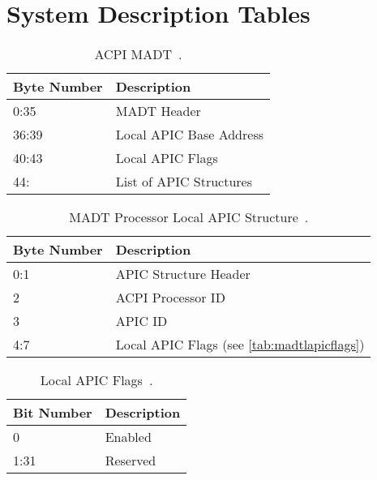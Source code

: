 \clearpage

\section{System Description Tables}
\label{sec:sdts}

\begin{table}[H]
  \centering
  \begin{tabularx}{1.0\textwidth}{| X | X |}
    \hline
    \textbf{Byte Number} & \textbf{Description}    \\ \hline\hline
    0:35                 & MADT Header             \\ \hline
    36:39                & Local APIC Base Address \\ \hline
    40:43                & Local APIC Flags        \\ \hline
    44:                  & List of APIC Structures \\ \hline
  \end{tabularx}
  \caption{ACPI MADT~\cite[sec.~5.2.8]{acpi1}.}
  \label{tab:madt}
\end{table}

\begin{table}[H]
  \centering
  \begin{tabularx}{1.0\textwidth}{| X | X |}
    \hline
    \textbf{Byte Number} & \textbf{Description}                                \\ \hline\hline
    0:1                  & APIC Structure Header                               \\ \hline
    2                    & ACPI Processor ID                                   \\ \hline
    3                    & APIC ID                                             \\ \hline
    4:7                  & Local APIC Flags (see \autoref{tab:madtlapicflags}) \\ \hline
  \end{tabularx}
  \caption{MADT Processor Local APIC Structure~\cite[sec.~5.2.8.1]{acpi1}.}
  \label{tab:madtlapic}
\end{table}

\begin{table}[H]
  \centering
  \begin{tabularx}{1.0\textwidth}{| X | X |}
    \hline
    \textbf{Bit Number} & \textbf{Description} \\ \hline\hline
    0                   & Enabled              \\ \hline
    1:31                & Reserved             \\ \hline
  \end{tabularx}
  \caption{Local APIC Flags~\cite[sec.~5.2.8.1]{acpi1}.}
  \label{tab:madtlapicflags}
\end{table}

